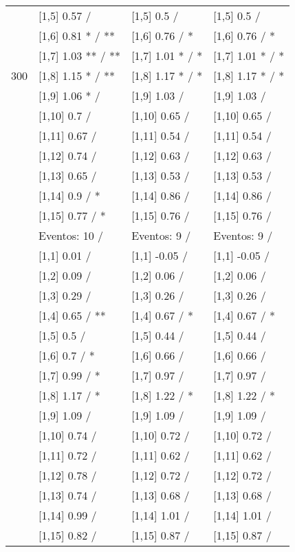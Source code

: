 \begin{table}
\begin{tabular}[t]{llll}
 & {}[1,5] 0.57  / & {}[1,5] 0.5  / & {}[1,5] 0.5  /\\
 & {}[1,6] 0.81 * / ** & {}[1,6] 0.76  / * & {}[1,6] 0.76  / *\\
 & {}[1,7] 1.03 ** / ** & {}[1,7] 1.01 * / * & {}[1,7] 1.01 * / *\\
300 & {}[1,8] 1.15 * / ** & {}[1,8] 1.17 * / * & {}[1,8] 1.17 * / *\\
\addlinespace
 & {}[1,9] 1.06 * / & {}[1,9] 1.03  / & {}[1,9] 1.03  /\\
 & {}[1,10] 0.7  / & {}[1,10] 0.65  / & {}[1,10] 0.65  /\\
 & {}[1,11] 0.67  / & {}[1,11] 0.54  / & {}[1,11] 0.54  /\\
 & {}[1,12] 0.74  / & {}[1,12] 0.63  / & {}[1,12] 0.63  /\\
 & {}[1,13] 0.65  / & {}[1,13] 0.53  / & {}[1,13] 0.53  /\\
\addlinespace
 & {}[1,14] 0.9  / * & {}[1,14] 0.86  / & {}[1,14] 0.86  /\\
 & {}[1,15] 0.77  / * & {}[1,15] 0.76  / & {}[1,15] 0.76  /\\
 & Eventos:  10 / & Eventos:  9 / & Eventos:  9 /\\
 & {}[1,1] 0.01  / & {}[1,1] -0.05  / & {}[1,1] -0.05  /\\
 & {}[1,2] 0.09  / & {}[1,2] 0.06  / & {}[1,2] 0.06  /\\
\addlinespace
 & {}[1,3] 0.29  / & {}[1,3] 0.26  / & {}[1,3] 0.26  /\\
 & {}[1,4] 0.65  / ** & {}[1,4] 0.67  / * & {}[1,4] 0.67  / *\\
 & {}[1,5] 0.5  / & {}[1,5] 0.44  / & {}[1,5] 0.44  /\\
 & {}[1,6] 0.7  / * & {}[1,6] 0.66  / & {}[1,6] 0.66  /\\
 & {}[1,7] 0.99  / * & {}[1,7] 0.97  / & {}[1,7] 0.97  /\\
\addlinespace
500 & {}[1,8] 1.17  / * & {}[1,8] 1.22  / * & {}[1,8] 1.22  / *\\
 & {}[1,9] 1.09  / & {}[1,9] 1.09  / & {}[1,9] 1.09  /\\
 & {}[1,10] 0.74  / & {}[1,10] 0.72  / & {}[1,10] 0.72  /\\
 & {}[1,11] 0.72  / & {}[1,11] 0.62  / & {}[1,11] 0.62  /\\
 & {}[1,12] 0.78  / & {}[1,12] 0.72  / & {}[1,12] 0.72  /\\
\addlinespace
 & {}[1,13] 0.74  / & {}[1,13] 0.68  / & {}[1,13] 0.68  /\\
 & {}[1,14] 0.99  / & {}[1,14] 1.01  / & {}[1,14] 1.01  /\\
 & {}[1,15] 0.82  / & {}[1,15] 0.87  / & {}[1,15] 0.87  /\\
\bottomrule
\end{tabular}
\end{table}
